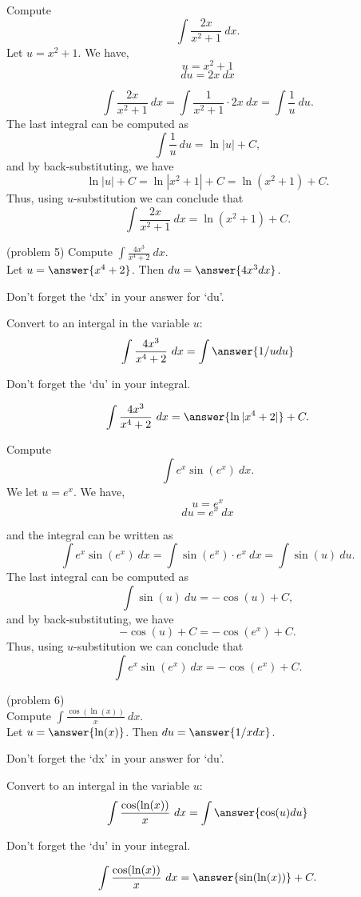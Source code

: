 \documentclass[handout]{ximera}
\begin{document}
\begin{example}[example 5] Compute 
\[\int \frac{2x}{x^2 + 1} \ dx.\]
Let $u = x^2 + 1$.  We have,
\[u = x^2 + 1\]
\[du = 2x \ dx\]

\[\int \frac{2x}{x^2 + 1} \ dx = \int \frac{1}{x^2 + 1} \cdot 2x\  dx = \int \frac{1}{u} \ du.\]
The last integral can be computed as 
\[\int \frac{1}{u} \ du = \ln|u| + C,\]
and by back-substituting, we have 
\[\ln|u| + C =  \ln|x^2 + 1| + C=\ln(x^2 + 1) + C.\]
Thus, using $u$-substitution we can conclude that
\[\int \frac{2x}{x^2 + 1} \ dx =  \ln(x^2 + 1) + C.\]
\end{example}


\begin{problem} (problem 5) Compute $\displaystyle{\int \frac{4x^3}{x^4 +2} \ dx}$.\\
Let $u = \answer{x^4 + 2}$. Then $du = \answer{4x^3 dx}$.\\
\begin{hint}
Don't forget the `dx' in your answer for `du'.
\end{hint}
Convert to an intergal in the variable $u$:
\[\int \frac{4x^3}{x^4 +2} \ dx = \int\answer{1/u du}\]
\begin{hint}
Don't forget the `du' in your integral.
\end{hint}

\[\int \frac{4x^3}{x^4 +2} \ dx = \answer{\ln|x^4 +2|} +C.\]
\end{problem}



\begin{example}[example 6] Compute 
\[\int e^x\sin(e^x) \ dx.\]
We let $u = e^x$.  We have,
\[u = e^x\]
\[du = e^x \ dx\]

and the integral can be written as 
\[\int e^x\sin(e^x) \ dx = \int \sin(e^x) \cdot e^x \  dx = \int \sin(u) \ du.\]
The last integral can be computed as 
\[\int \sin(u) \ du = -\cos(u) + C,\]
and by back-substituting, we have 
\[-\cos(u) + C = -\cos(e^x) + C.\]
Thus, using $u$-substitution we can conclude that
\[\int e^x\sin(e^x) \ dx =  -\cos(e^x) + C.\]
\end{example}




\begin{problem}(problem 6)\\
Compute $\displaystyle{\int \frac{\cos(\ln(x))}{x} \ dx}$.\\
Let $u = \answer{\ln(x)}$. Then $du = \answer{1/x dx}$.\\
\begin{hint}
Don't forget the `dx' in your answer for `du'.
\end{hint}
Convert to an intergal in the variable $u$:
\[\int \frac{\cos(\ln(x))}{x} \ dx = \int\answer{\cos(u) du}\]
\begin{hint}
Don't forget the `du' in your integral.
\end{hint}

\[\int \frac{\cos(\ln(x))}{x} \ dx = \answer{\sin(\ln(x))} +C.\]
\end{problem}
\end{document}
